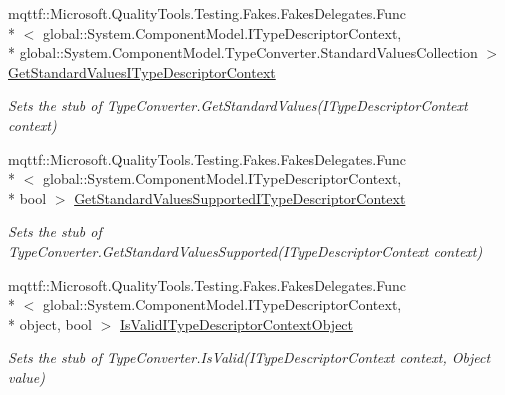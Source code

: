 \begin{DoxyCompactItemize}
mqttf\-::\-Microsoft.\-Quality\-Tools.\-Testing.\-Fakes.\-Fakes\-Delegates.\-Func\\*
$<$ global\-::\-System.\-Component\-Model.\-I\-Type\-Descriptor\-Context, \\*
global\-::\-System.\-Component\-Model.\-Type\-Converter.\-Standard\-Values\-Collection $>$ \hyperlink{class_system_1_1_component_model_1_1_fakes_1_1_stub_expandable_object_converter_a066ab97473767d4ea105b9d249e99191}{Get\-Standard\-Values\-I\-Type\-Descriptor\-Context}
\begin{DoxyCompactList}\small\item\em Sets the stub of Type\-Converter.\-Get\-Standard\-Values(\-I\-Type\-Descriptor\-Context context)\end{DoxyCompactList}\item 
mqttf\-::\-Microsoft.\-Quality\-Tools.\-Testing.\-Fakes.\-Fakes\-Delegates.\-Func\\*
$<$ global\-::\-System.\-Component\-Model.\-I\-Type\-Descriptor\-Context, \\*
bool $>$ \hyperlink{class_system_1_1_component_model_1_1_fakes_1_1_stub_expandable_object_converter_abd5b7aaa65547eb4946a27d30d37c3d4}{Get\-Standard\-Values\-Supported\-I\-Type\-Descriptor\-Context}
\begin{DoxyCompactList}\small\item\em Sets the stub of Type\-Converter.\-Get\-Standard\-Values\-Supported(\-I\-Type\-Descriptor\-Context context)\end{DoxyCompactList}\item 
mqttf\-::\-Microsoft.\-Quality\-Tools.\-Testing.\-Fakes.\-Fakes\-Delegates.\-Func\\*
$<$ global\-::\-System.\-Component\-Model.\-I\-Type\-Descriptor\-Context, \\*
object, bool $>$ \hyperlink{class_system_1_1_component_model_1_1_fakes_1_1_stub_expandable_object_converter_adf4a1e64fe918289b8f58394c55df268}{Is\-Valid\-I\-Type\-Descriptor\-Context\-Object}
\begin{DoxyCompactList}\small\item\em Sets the stub of Type\-Converter.\-Is\-Valid(\-I\-Type\-Descriptor\-Context context, Object value)\end{DoxyCompactList}\end{DoxyCompactItemize}
